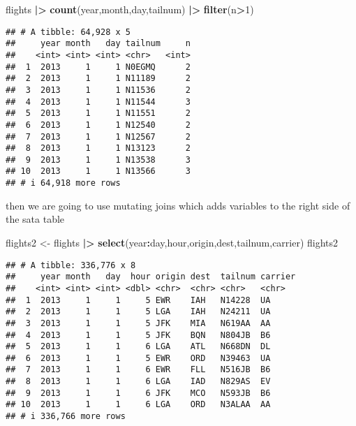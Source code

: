 \documentclass[
]{article}
\newenvironment{Shaded}{\begin{snugshade}}{\end{snugshade}}
\newcommand{\DecValTok}[1]{\textcolor[rgb]{0.00,0.00,0.81}{#1}}
\newcommand{\FunctionTok}[1]{\textcolor[rgb]{0.13,0.29,0.53}{\textbf{#1}}}
\newcommand{\NormalTok}[1]{#1}
\newcommand{\OtherTok}[1]{\textcolor[rgb]{0.56,0.35,0.01}{#1}}
\newcommand{\SpecialCharTok}[1]{\textcolor[rgb]{0.81,0.36,0.00}{\textbf{#1}}}
\begin{document}
\begin{Shaded}
\begin{Highlighting}[]
\NormalTok{flights }\SpecialCharTok{|\textgreater{}}
  \FunctionTok{count}\NormalTok{(year,month,day,tailnum) }\SpecialCharTok{|\textgreater{}}
  \FunctionTok{filter}\NormalTok{(n}\SpecialCharTok{\textgreater{}}\DecValTok{1}\NormalTok{)}
\end{Highlighting}
\end{Shaded}

\begin{verbatim}
## # A tibble: 64,928 x 5
##     year month   day tailnum     n
##    <int> <int> <int> <chr>   <int>
##  1  2013     1     1 N0EGMQ      2
##  2  2013     1     1 N11189      2
##  3  2013     1     1 N11536      2
##  4  2013     1     1 N11544      3
##  5  2013     1     1 N11551      2
##  6  2013     1     1 N12540      2
##  7  2013     1     1 N12567      2
##  8  2013     1     1 N13123      2
##  9  2013     1     1 N13538      3
## 10  2013     1     1 N13566      3
## # i 64,918 more rows
\end{verbatim}

then we are going to use mutating joins which adds variables to the
right side of the sata table

\begin{Shaded}
\begin{Highlighting}[]
\NormalTok{flights2 }\OtherTok{\textless{}{-}}\NormalTok{ flights }\SpecialCharTok{|\textgreater{}}
  \FunctionTok{select}\NormalTok{(year}\SpecialCharTok{:}\NormalTok{day,hour,origin,dest,tailnum,carrier)}
\NormalTok{flights2}
\end{Highlighting}
\end{Shaded}

\begin{verbatim}
## # A tibble: 336,776 x 8
##     year month   day  hour origin dest  tailnum carrier
##    <int> <int> <int> <dbl> <chr>  <chr> <chr>   <chr>  
##  1  2013     1     1     5 EWR    IAH   N14228  UA     
##  2  2013     1     1     5 LGA    IAH   N24211  UA     
##  3  2013     1     1     5 JFK    MIA   N619AA  AA     
##  4  2013     1     1     5 JFK    BQN   N804JB  B6     
##  5  2013     1     1     6 LGA    ATL   N668DN  DL     
##  6  2013     1     1     5 EWR    ORD   N39463  UA     
##  7  2013     1     1     6 EWR    FLL   N516JB  B6     
##  8  2013     1     1     6 LGA    IAD   N829AS  EV     
##  9  2013     1     1     6 JFK    MCO   N593JB  B6     
## 10  2013     1     1     6 LGA    ORD   N3ALAA  AA     
## # i 336,766 more rows
\end{verbatim}
\end{document}
